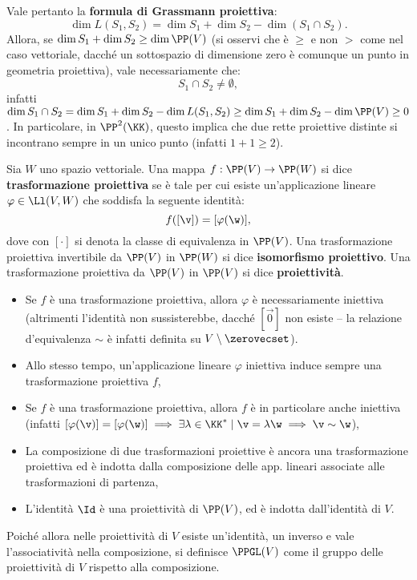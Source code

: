 \documentclass[10pt,landscape]{article}
\begin{document}
\begin{multicols}{3}
		
		Vale pertanto la \textbf{formula di Grassmann proiettiva}:
		\[ \dim L(S_1, S_2) = \dim S_1 + \dim S_2 - \dim (S_1 \cap S_2). \]
		Allora, se $\dim S_1 + \dim S_2 \geq \dim \PP(V)$ (si osservi che è
		$\geq$ e non $>$ come nel caso vettoriale, dacché un sottospazio di dimensione
		zero è comunque un punto in geometria proiettiva), vale necessariamente
		che:
		\[ S_1 \cap S_2 \neq \emptyset, \]
		infatti $\dim S_1 \cap S_2 = \dim S_1 + \dim S_2 - \dim L(S_1, S_2) \geq
		\dim S_1 + \dim S_2 - \dim \PP(V) \geq 0$. In particolare, in $\PP^2(\KK)$,
		questo implica che due rette proiettive distinte si incontrano sempre in un unico
		punto (infatti $1+1\geq2$).
		
		Sia $W$ uno spazio vettoriale. Una mappa $f : \PP(V) \to \PP(W)$ si dice
		\textbf{trasformazione proiettiva} se è tale per cui esiste un'applicazione
		lineare $\varphi \in \Ll(V, W)$ che soddisfa la seguente identità:
		\[ f([\v]) = [\varphi(\w)], \]
		dove con $[\cdot]$ si denota la classe di equivalenza in $\PP(V)$.
		Una trasformazione proiettiva invertibile da $\PP(V)$ in $\PP(W)$
		si dice \textbf{isomorfismo proiettivo}. Una
		trasformazione proiettiva da $\PP(V)$ in $\PP(V)$ si dice
		\textbf{proiettività}.
		
		\begin{itemize}
			\item Se $f$ è una trasformazione proiettiva, allora $\varphi$ è necessariamente
				iniettiva (altrimenti l'identità non sussisterebbe, dacché $[\vec 0]$ non
				esiste -- la relazione d'equivalenza $\sim$ è infatti definita su $V \setminus
				\zerovecset$).
			\item Allo stesso tempo, un'applicazione lineare $\varphi$ iniettiva induce
				sempre una trasformazione proiettiva $f$,
			\item Se $f$ è una trasformazione proiettiva, allora $f$ è in particolare anche
				iniettiva (infatti $[\varphi(\v)] = [\varphi(\w)] \implies \exists \lambda \in \KK^* \mid \v = \lambda \w \implies \v \sim \w$),
			\item La composizione di due trasformazioni proiettive è ancora una
				trasformazione proiettiva ed è indotta dalla composizione delle app.
				lineari associate alle trasformazioni di partenza,
			\item L'identità $\Id$ è una proiettività di $\PP(V)$, ed è indotta
				dall'identità di $V$.
		\end{itemize}
		
		Poiché allora nelle proiettività di $V$ esiste un'identità, un inverso e vale
		l'associatività nella composizione, si definisce $\PPGL(V)$ come il gruppo delle
		proiettività di $V$ rispetto alla composizione.
		

\end{multicols}
\end{document}
